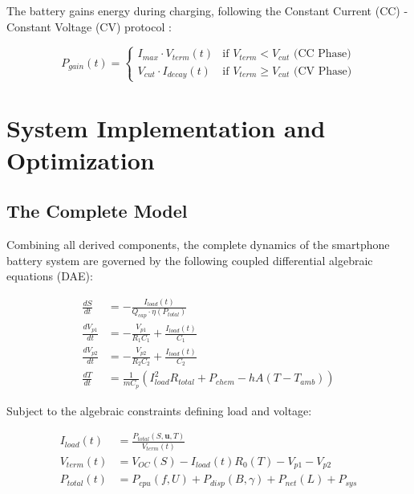\documentclass[12pt]{article}
\begin{document}
The battery gains energy during charging, following the Constant Current (CC) - Constant Voltage (CV) protocol \cite{6}:

\begin{equation} \label{eq:charging}
P_{gain}(t) = \begin{cases} 
I_{max} \cdot V_{term}(t) & \text{if } V_{term} < V_{cut} \text{ (CC Phase)} \\
V_{cut} \cdot I_{decay}(t) & \text{if } V_{term} \ge V_{cut} \text{ (CV Phase)}
\end{cases}
\end{equation}


\section{System Implementation and Optimization}

\subsection{The Complete Model}

Combining all derived components, the complete dynamics of the smartphone battery system are governed by the following coupled differential algebraic equations (DAE):

\begin{align}
\label{eq:gov_soc}
\frac{dS}{dt} &= - \frac{I_{load}(t)}{Q_{cap} \cdot \eta(P_{total})} \\
\label{eq:gov_vp1}
\frac{dV_{p1}}{dt} &= -\frac{V_{p1}}{R_1 C_1} + \frac{I_{load}(t)}{C_1} \\
\label{eq:gov_vp2}
\frac{dV_{p2}}{dt} &= -\frac{V_{p2}}{R_2 C_2} + \frac{I_{load}(t)}{C_2} \\
\label{eq:gov_temp}
\frac{dT}{dt} &= \frac{1}{m C_p} \left( I_{load}^2 R_{total} + P_{chem} - h A (T - T_{amb}) \right)
\end{align}

Subject to the algebraic constraints defining load and voltage:

\begin{align}
\label{eq:gov_current}
I_{load}(t) &= \frac{P_{total}(S, \mathbf{u}, T)}{V_{term}(t)} \\
\label{eq:gov_voltage}
V_{term}(t) &= V_{OC}(S) - I_{load}(t)R_0(T) - V_{p1} - V_{p2} \\
\label{eq:gov_power}
P_{total}(t) &= P_{cpu}(f,U) + P_{disp}(B,\gamma) + P_{net}(L) + P_{sys}
\end{align}
\end{document}
